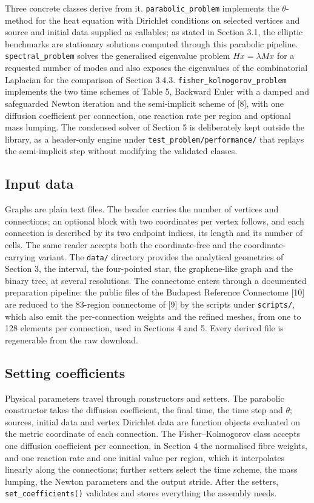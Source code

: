 \documentclass[11pt,a4paper]{article}
\begin{document}
Three concrete classes derive from it. \texttt{parabolic\_problem}
implements the $\theta$-method for the heat equation with Dirichlet
conditions on selected vertices and source and initial data supplied as
callables; as stated in Section 3.1, the elliptic benchmarks are stationary
solutions computed through this parabolic pipeline.
\texttt{spectral\_problem} solves the generalised eigenvalue problem
$Hx=\lambda Mx$ for a requested number of modes and also exposes the
eigenvalues of the combinatorial Laplacian for the comparison of Section
3.4.3. \texttt{fisher\_kolmogorov\_problem} implements the two time schemes
of Table 5, Backward Euler with a damped and safeguarded Newton iteration
and the semi-implicit scheme of [8], with one diffusion coefficient per
connection, one reaction rate per region and optional mass lumping. The
condensed solver of Section 5 is deliberately kept outside the library, as
a header-only engine under \texttt{test\_problem/performance/} that replays
the semi-implicit step without modifying the validated classes.

\subsection{Input data}

Graphs are plain text files. The header carries the number of vertices and
connections; an optional block with two coordinates per vertex follows, and
each connection is described by its two endpoint indices, its length and
its number of cells. The same reader accepts both the coordinate-free and
the coordinate-carrying variant. The \texttt{data/} directory provides the
analytical geometries of Section 3, the interval, the four-pointed star,
the graphene-like graph and the binary tree, at several resolutions. The
connectome enters through a documented preparation pipeline: the public
files of the Budapest Reference Connectome [10] are reduced to the
83-region connectome of [9] by the scripts under \texttt{scripts/}, which
also emit the per-connection weights and the refined meshes, from one to
128 elements per connection, used in Sections 4 and 5. Every derived file
is regenerable from the raw download.

\subsection{Setting coefficients}

Physical parameters travel through constructors and setters. The parabolic
constructor takes the diffusion coefficient, the final time, the time step
and $\theta$; sources, initial data and vertex Dirichlet data are function
objects evaluated on the metric coordinate of each connection. The
Fisher--Kolmogorov class accepts one diffusion coefficient per connection,
in Section 4 the normalised fibre weights, and one reaction rate and one
initial value per region, which it interpolates linearly along the
connections; further setters select the time scheme, the mass lumping, the
Newton parameters and the output stride. After the
setters, \texttt{set\_coefficients()} validates and stores everything the
assembly needs.
\end{document}
